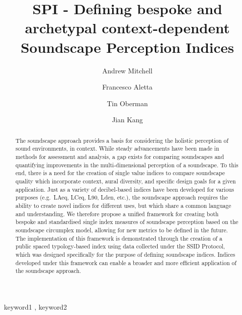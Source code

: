 \documentclass[
  authoryear,
  preprint,
  3p]{elsarticle}
\begin{document}
\begin{frontmatter}
\title{SPI - Defining bespoke and archetypal context-dependent
Soundscape Perception Indices}
\author[1]{Andrew Mitchell%
%
}
\author[1]{Francesco Aletta%
%
}
\author[1]{Tin Oberman%
%
}
\author[]{Jian Kang%
%
}






        
\begin{abstract}
The soundscape approach provides a basis for considering the holistic
perception of sound environments, in context. While steady advancements
have been made in methods for assessment and analysis, a gap exists for
comparing soundscapes and quantifying improvements in the
multi-dimensional perception of a soundscape. To this end, there is a
need for the creation of single value indices to compare soundscape
quality which incorporate context, aural diversity, and specific design
goals for a given application. Just as a variety of decibel-based
indices have been developed for various purposes (e.g.~LAeq, LCeq, L90,
Lden, etc.), the soundscape approach requires the ability to create
novel indices for different uses, but which share a common language and
understanding. We therefore propose a unified framework for creating
both bespoke and standardised single index measures of soundscape
perception based on the soundscape circumplex model, allowing for new
metrics to be defined in the future. The implementation of this
framework is demonstrated through the creation of a public spaced
typology-based index using data collected under the SSID Protocol, which
was designed specifically for the purpose of defining soundscape
indices. Indices developed under this framework can enable a broader and
more efficient application of the soundscape approach.
\end{abstract}





\begin{keyword}
    keyword1 \sep 
    keyword2
\end{keyword}
\end{frontmatter}
    
\end{document}
